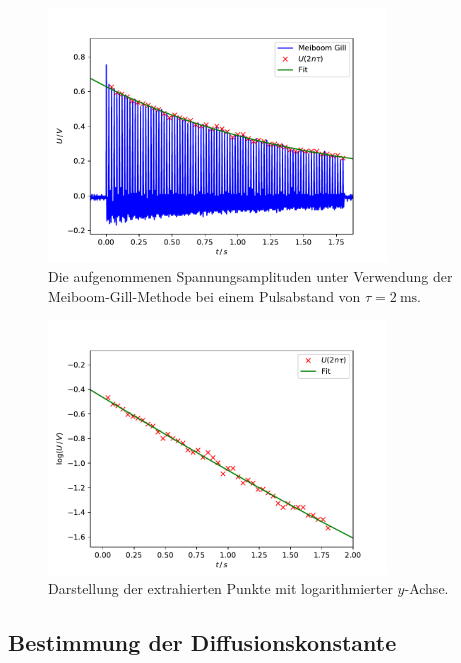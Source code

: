 \begin{figure}[h]
  \centering
  \includegraphics[width=0.8\textwidth]{Plots2/T2.pdf}
  \caption{Die aufgenommenen Spannungsamplituden unter Verwendung der
  Meiboom-Gill-Methode bei einem Pulsabstand von $\tau = \SI{2}{\milli\second}$.}
  \label{fig:T2}
\end{figure}
\begin{figure}
  \centering
  \includegraphics[width=0.8\textwidth]{Plots2/T2Log.pdf}
  \caption{Darstellung der extrahierten Punkte mit logarithmierter $y$-Achse.}
  \label{fig:T2Log}
\end{figure}


\newpage
\subsection{Bestimmung der Diffusionskonstante}


